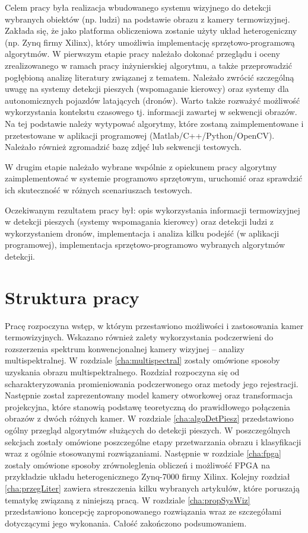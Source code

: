 Celem pracy była realizacja wbudowanego systemu wizyjnego do detekcji wybranych obiektów (np. ludzi) na podstawie obrazu z kamery termowizyjnej. Zakłada się, że jako platforma obliczeniowa zostanie użyty układ heterogeniczny (np. Zynq firmy Xilinx), który umożliwia implementację sprzętowo-programową algorytmów.
W pierwszym etapie pracy należało dokonać przeglądu i oceny zrealizowanego w ramach pracy inżynierskiej algorytmu, a także przeprowadzić pogłębioną analizę literatury związanej z tematem. Należało zwrócić szczególną uwagę na systemy detekcji pieszych (wspomaganie kierowcy) oraz systemy dla autonomicznych pojazdów latających (dronów). Warto także rozważyć możliwość wykorzystania kontekstu czasowego tj. informacji zawartej w sekwencji obrazów. Na tej podstawie należy wytypować algorytmy, które zostaną zaimplementowane i przetestowane w aplikacji programowej (Matlab/C++/Python/OpenCV). Należało również zgromadzić bazę zdjęć lub sekwencji testowych.

W drugim etapie należało wybrane wspólnie z opiekunem pracy algorytmy zaimplementować w systemie programowo sprzętowym, uruchomić oraz sprawdzić ich skuteczność w różnych scenariuszach testowych.

Oczekiwanym rezultatem pracy był: opis wykorzystania informacji termowizyjnej w detekcji pieszych (systemy wspomagania kierowcy) oraz detekcji ludzi z wykorzystaniem dronów, implementacja i analiza kilku podejść (w aplikacji programowej), implementacja sprzętowo-programowo wybranych algorytmów detekcji.

\section{Struktura pracy}

Pracę rozpoczyna wstęp, w którym przestawiono możliwości i zastosowania kamer termowizyjnych. Wskazano również zalety wykorzystania podczerwieni do rozszerzenia spektrum konwencjonalnej kamery wizyjnej – analizy multispektralnej.
W rozdziale \ref{cha:multispectral} zostały omówione sposoby uzyskania obrazu multispektralnego. Rozdział rozpoczyna się od scharakteryzowania promieniowania podczerwonego oraz metody jego rejestracji. Następnie został zaprezentowany model kamery otworkowej oraz transformacja projekcyjna, które stanowią podstawę teoretyczną do prawidłowego połączenia obrazów z dwóch różnych kamer.
W rozdziale \ref{cha:algoDetPiesz} przedstawiono ogólny przegląd algorytmów służących do detekcji pieszych. W poszczególnych sekcjach zostały omówione poszczególne etapy przetwarzania obrazu i klasyfikacji wraz z ogólnie stosowanymi rozwiązaniami.
Następnie w rozdziale \ref{cha:fpga} zostały omówione sposoby zrównoleglenia obliczeń i możliwość FPGA na przykładzie układu heterogenicznego Zynq-7000 firmy Xilinx.
Kolejny rozdział \ref{cha:przegLiter} zawiera streszczenia kilku wybranych artykułów, które poruszają tematykę związaną z niniejszą pracą.
W rozdziale \ref{cha:propSysWiz} przedstawiono koncepcję zaproponowanego rozwiązania wraz ze szczegółami dotyczącymi jego wykonania.
Całość zakończono podsumowaniem.

